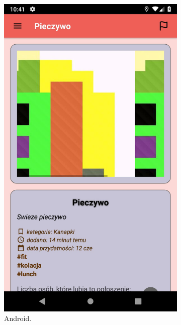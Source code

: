\documentclass[licencjacka]{pracamgr}
\begin{document}
\newpage
\begin{figure}[h!]
  \centering
  \begin{subfigure}[b]{0.4\linewidth}
    \includegraphics[width=\linewidth]{android2.jpg}
    \caption{Android.}
  \end{subfigure}
  \begin{subfigure}[b]{0.4\linewidth}

\end{subfigure}
\end{figure}
\end{document}
